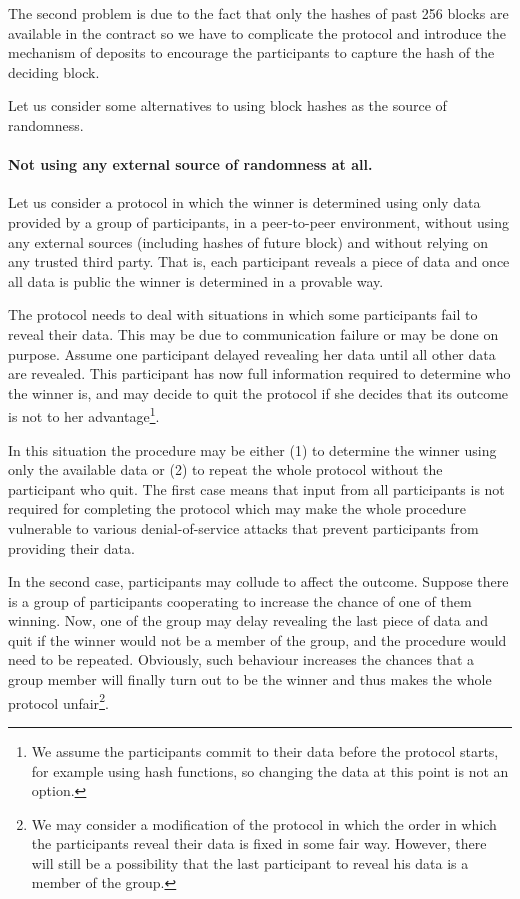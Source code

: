 \documentclass[a4paper]{article}
\begin{document}
    The second problem is due to the fact that only the hashes of past 256 blocks are available in the contract
    so we have to complicate the protocol and introduce the mechanism of deposits to encourage the participants
    to capture the hash of the deciding block.

    Let us consider some alternatives to using block hashes as the source of randomness.

    \paragraph{Not using any external source of randomness at all.}
    Let us consider a protocol in which the winner is determined using only data provided by a group of participants,
    in a peer-to-peer environment, without using any external sources (including hashes of future block) and without
    relying on any trusted third party. That is, each participant reveals a piece of data and once all data is public
    the winner is determined in a provable way.

    The protocol needs to deal with situations in which some participants fail to reveal their data. This may be due
    to communication failure or may be done on purpose. Assume one participant delayed revealing her data until all
    other data are revealed. This participant has now full information required to determine who the winner is,
    and may decide to quit the protocol if she decides that its outcome is not to her advantage\footnote{We assume
    the participants commit to their data before the protocol starts, for example using hash functions,
    so changing the data at this point is not an option.}.

    In this situation the procedure may be either (1) to determine the winner using only the available data or (2)
    to repeat the whole protocol without the participant who quit. The first case means that input from all
    participants is not required for completing the protocol which may make the whole procedure vulnerable to
    various denial-of-service attacks that prevent participants from providing their data.

    In the second case, participants may collude to affect the outcome. Suppose there is a group of participants
    cooperating to increase the chance of one of them winning. Now, one of the group may delay revealing the last
    piece of data and quit if the winner would not be a member of the group, and the procedure would need to be
    repeated. Obviously, such behaviour increases the chances that a group member will finally turn out to be the
    winner and thus makes the whole protocol unfair\footnote{We may consider a modification of the protocol in which
    the order in which the participants reveal their data is fixed in some fair way. However, there will still be
    a possibility that the last participant to reveal his data is a member of the group.}.
\end{document}
